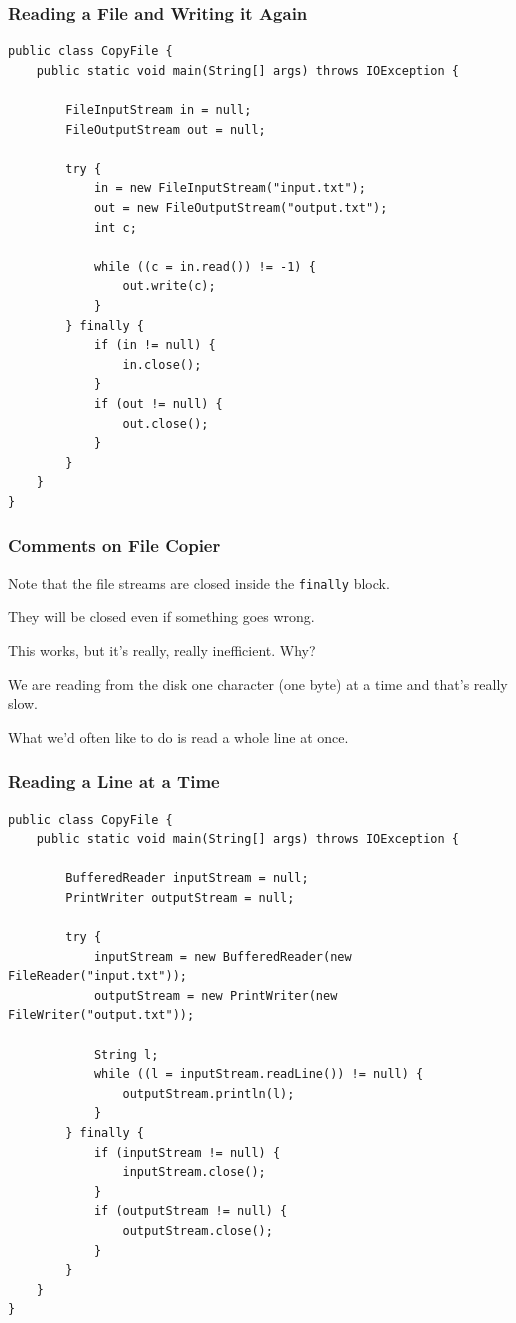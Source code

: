 \begin{frame}[fragile]
\frametitle{Reading a File and Writing it Again}
\begin{changemargin}{1cm}
{\tiny
\begin{verbatim}
public class CopyFile {
    public static void main(String[] args) throws IOException {

        FileInputStream in = null;
        FileOutputStream out = null;

        try {
            in = new FileInputStream("input.txt");
            out = new FileOutputStream("output.txt");
            int c;

            while ((c = in.read()) != -1) {
                out.write(c);
            }
        } finally {
            if (in != null) {
                in.close();
            }
            if (out != null) {
                out.close();
            }
        }
    }
}
\end{verbatim}
}
\end{changemargin}
\end{frame}

\begin{frame}
\frametitle{Comments on File Copier}
\begin{changemargin}{1cm}

Note that the file streams are closed inside the \texttt{finally} block.

They will be closed even if something goes wrong. 

This works, but it's really, really inefficient. Why? 

We are reading from the disk one character (one byte) at a time and that's really slow. 

What we'd often like to do is read a whole line at once. 

\end{changemargin}
\end{frame}

\begin{frame}[fragile]
\frametitle{Reading a Line at a Time}
\begin{changemargin}{1cm}
{\tiny
\begin{verbatim}
public class CopyFile {
    public static void main(String[] args) throws IOException {

        BufferedReader inputStream = null;
        PrintWriter outputStream = null;

        try {
            inputStream = new BufferedReader(new FileReader("input.txt"));
            outputStream = new PrintWriter(new FileWriter("output.txt"));

            String l;
            while ((l = inputStream.readLine()) != null) {
                outputStream.println(l);
            }
        } finally {
            if (inputStream != null) {
                inputStream.close();
            }
            if (outputStream != null) {
                outputStream.close();
            }
        }
    }
}
\end{verbatim}
}

\end{changemargin}
\end{frame}

